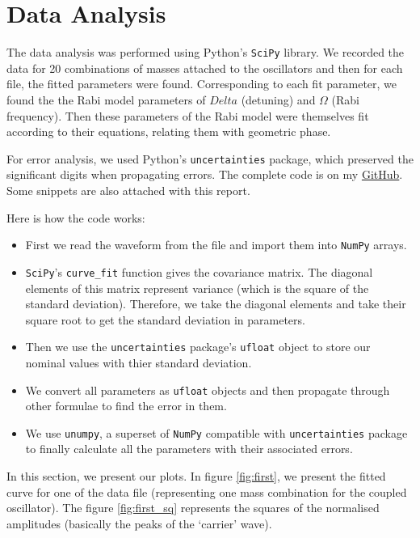 \chapter{\label{method}Data Analysis}
The data analysis was performed using Python's \texttt{SciPy} library. We recorded the data for 20 combinations of masses attached to the oscillators and then for each file, the fitted parameters were found. Corresponding to each fit parameter, we found the the Rabi model parameters of $ Delta $ (detuning) and $ \Omega $ (Rabi frequency). Then these parameters of the Rabi model were themselves fit according to their equations, relating them with geometric phase.

For error analysis, we used Python's  \texttt{uncertainties} package, which preserved the significant digits when propagating errors. The complete code is on my \href{https://github.com/peakcipher/p442-integrated-lab/tree/master/IV.\%20Coupled\%20Oscillator}{GitHub}. Some snippets are also attached with this report.

Here is how the code works:
\begin{itemize}
	\item First we read the waveform from the file and import them into \texttt{NumPy} arrays.
	\item \texttt{SciPy}'s \texttt{curve\_fit} function gives the covariance matrix. The diagonal elements of this matrix represent variance (which is the square of the standard deviation). Therefore, we take the diagonal elements and take their square root to get the standard deviation in parameters.
	\item Then we use the \texttt{uncertainties} package's \texttt{ufloat} object to store our nominal values with thier standard deviation.
	\item We convert all parameters as \texttt{ufloat} objects and then propagate through other formulae to find the error in them.
	\item We use \texttt{unumpy}, a superset of \texttt{NumPy} compatible with \texttt{uncertainties} package to finally calculate all the parameters with their associated errors.
\end{itemize} 

In this section, we present our plots. In figure \ref{fig:first}, we present the fitted curve for one of the data file (representing one mass combination for the coupled oscillator). The figure \ref{fig:first_sq} represents the squares of the normalised amplitudes (basically the peaks of the `carrier' wave).

